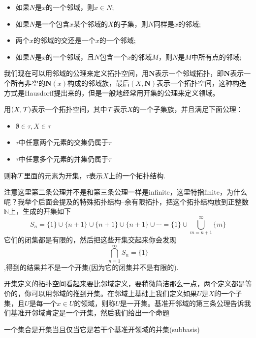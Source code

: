 \begin{definition}
\begin{itemize}
	\item 如果$N$是$x$的一个邻域，则$x \in N$;
	\item 如果$N$是一个包含$x$某个邻域的$X$的子集，则$N$同样是$x$的邻域;
	\item 两个$x$的邻域的交还是一个$x$的一个邻域;
	\item 如果$N$是$x$的一个邻域，且$N$包含一个$x$的邻域$M$，则$N$是$M$中所有点的邻域;
\end{itemize}
\end{definition}

我们现在可以用邻域的公理来定义拓扑空间，用$\mathbf{N}$表示一个邻域拓扑，即$\mathbf{N}$表示一个所有非空的$\mathbf{N}(x)$构成的邻域族，最后$(X,\mathbf{N})$表示一个拓扑空间，这种构造方式是Hausdorff提出来的，但是一般地经常用开集的公理来定义领域。

\begin{definition}
用$(X,\mathcal{T})$表示一个拓扑空间，其中$\mathcal{T}$表示$X$的一个子集族，并且满足下面公理：
\begin{itemize}
	\item $\emptyset \in \tau,X \in \tau$
	\item $\tau$中任意两个元素的交集仍属于$\tau$
	\item $\tau$中任意多个元素的并集仍属于$\tau$
\end{itemize}	
则称$\mathcal{T}$里面的元素为开集，$\tau$表示$X$上的一个拓扑结构.
\end{definition}

注意这里第二条公理并不是和第三条公理一样是infinite，这里特指finite，为什么呢？我举个后面会提及的特殊拓扑结构--余有限拓扑，把这个拓扑结构放到正整数$\mathbb{N}$上，生成的开集如下\[S_n=\{1\} \cup \{n+1\} \cup \{n+1\} \cup \{n+1\} \cup \cdots = \{1\} \cup \bigcup\limits_{m=n+1}^{\infty}\{m\}  \]它们的闭集都是有限的，然后把这些开集交起来你会发现\[\bigcap\limits_{n=1}^{\infty} S_n = \{1\}\],得到的结果并不是一个开集(因为它的闭集并不是有限的).

开集定义的拓扑空间看起来要比邻域定义，要稍微简洁那么一点，两个定义都是等价的，你可以用邻域的推到开集。在邻域上基础上我们定义如果$U$是$X$的一个子集，且$U$是每一个$x \in U$的领域，则称$U$是一开集。基准开邻域的第三条公理告诉我们基准开邻域肯定是一个开集，然后我们给出一个命题

\begin{proposition}
\rm 一个集合是开集当且仅当它是若干个基准开领域的并集(subbasis)
\end{proposition}

